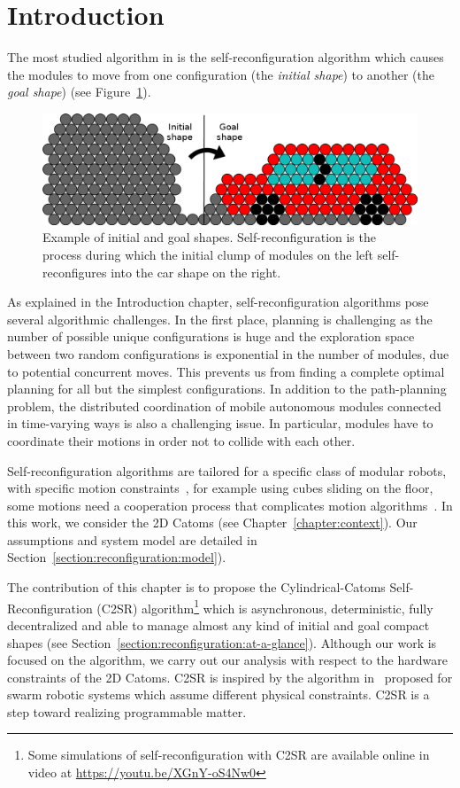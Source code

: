 \section{Introduction}

The most studied algorithm in  is the self-reconfiguration algorithm which causes the modules to move from one configuration (the \textit{initial shape}) to another (the \textit{goal shape}) (see Figure~\ref{fig:reconfiguration:example-car}). 

\begin{figure}[!h]
	\centering
	\includegraphics[width=0.7\linewidth]{images/reconfiguration/car}
	\caption{Example of initial and goal shapes. Self-reconfiguration is the process during which the initial clump of modules on the left self-reconfigures into the car shape on the right.}
	\label{fig:reconfiguration:example-car}
\end{figure}

As explained in the Introduction chapter, self-reconfiguration algorithms pose several algorithmic challenges. In the first place, planning is challenging as the number of possible unique configurations is huge and the exploration space between two random configurations is exponential in the number of modules, due to potential concurrent moves. This prevents us from finding a complete optimal planning for all but the simplest configurations. In addition to the path-planning problem, the distributed coordination of mobile autonomous modules connected in time-varying ways is also a challenging issue. In particular, modules have to coordinate their motions in order not to collide with each other.

Self-reconfiguration algorithms are tailored for a specific class of modular robots, with specific motion constraints~\cite{stoy2011current}, for example using cubes sliding on the floor, some motions need a cooperation process that complicates motion algorithms~\cite{pb16:ip}. In this work, we consider the 2D Catoms (see Chapter~\ref{chapter:context}). Our assumptions and system model are detailed in Section~\ref{section:reconfiguration:model}).

The contribution of this chapter is to propose the Cylindrical-Catoms Self-Reconfiguration (C2SR) algorithm\footnote{Some simulations of self-reconfiguration with C2SR are available online in video at \url{https://youtu.be/XGnY-oS4Nw0}} which is asynchronous, deterministic, fully decentralized and able to manage almost any kind of initial and goal compact shapes (see Section~\ref{section:reconfiguration:at-a-glance}). Although our work is focused on the algorithm, we carry out our analysis with respect to the hardware constraints of the 2D Catoms. C2SR is inspired by the algorithm in~\cite{rubenstein2014programmable} proposed for swarm robotic systems which assume different physical constraints. C2SR is a step toward realizing programmable matter.

